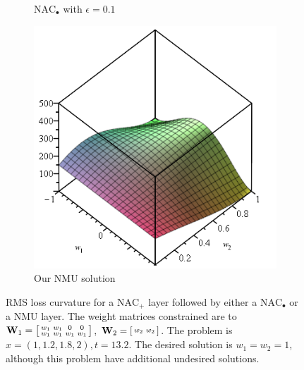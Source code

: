 \begin{figure}[h]
\begin{subfigure}{.33\textwidth}
  \caption{$\mathrm{NAC}_{\bullet}$ with $\epsilon = 0.1$}
\end{subfigure}
\begin{subfigure}{.33\textwidth}
  \centering
\includegraphics[width=\linewidth]{graphics/nac-mul-nmu.png}
  \caption{Our NMU solution}
\end{subfigure}

\caption{RMS loss curvature for a $\mathrm{NAC}_{+}$ layer followed by either a $\mathrm{NAC}_{\bullet}$ or a NMU layer. The weight matrices constrained are to $\mathbf{W}_1 = \left[\protect\begin{smallmatrix}
w_1 & w_1 & 0 & 0 \\
w_1 & w_1 & w_1 & w_1
\protect\end{smallmatrix}\right]$, $\mathbf{W}_2 = \left[\protect\begin{smallmatrix}
w_2 & w_2
\protect\end{smallmatrix}\right]$. The problem is $x = \left(1, 1.2, 1.8, 2\right), t = 13.2$. The desired solution is $w_1 = w_2 = 1$, although this problem have additional undesired solutions.}
\label{fig:nac-mul-eps-issue}
\end{figure}

